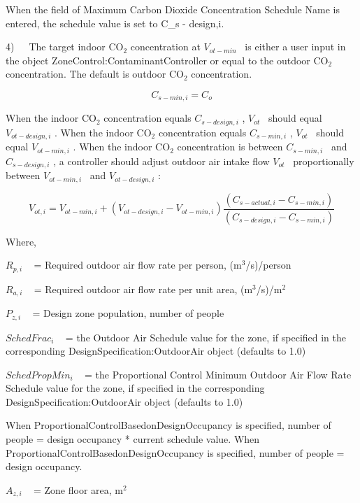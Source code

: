 When the field of Maximum Carbon Dioxide Concentration Schedule Name is entered, the schedule value is set to {C_{s - design,i}}. 

4)~~~The target indoor CO\(_{2}\) concentration at \({V_{ot - min}}\) ~is either a user input in the object ZoneControl:ContaminantController or equal to the outdoor CO\(_{2}\) concentration. The default is outdoor CO\(_{2}\) concentration.

\begin{equation}
{C_{s - min,i}} = {C_o}
\end{equation}

When the indoor CO\(_{2}\) concentration equals \({C_{s - design,i}}\) , \({V_{ot}}\) ~should equal \({V_{ot - design,i}}\) . When the indoor CO\(_{2}\) concentration equals \({C_{s - min,i}}\) , \({V_{ot}}\) ~should equal \({V_{ot - min,i}}\) . When the indoor CO\(_{2}\) concentration is between \({C_{s - min,i}}\) ~and \({C_{s - design,i}}\) , a controller should adjust outdoor air intake flow \({V_{ot}}\) ~proportionally between \({V_{ot - min,i}}\) ~and \({V_{ot - design,i}}\) :

\begin{equation}
{V_{ot,i}} = {V_{ot - min,i}} + ({V_{ot - design,i}} - {V_{ot - min,i}})\frac{{({C_{s - actual,i}} - {C_{s - min,i}})}}{{({C_{s - design,i}} - {C_{s - min,i}})}}
\end{equation}

Where,

\({R_{p,i}}\) ~ = Required outdoor air flow rate per person, (m\(^{3}\)/s)/person

\({R_{a,i}}\) ~ = Required outdoor air flow rate per unit area, (m\(^{3}\)/s)/m\(^{2}\)

\({P_{z,i}}\) ~ = Design zone population, number of people

\({SchedFrac_i}\) ~ = the Outdoor Air Schedule value for the zone, if specified in the corresponding DesignSpecification:OutdoorAir object (defaults to 1.0)

\({SchedPropMin_i}\) ~ = the Proportional Control Minimum Outdoor Air Flow Rate Schedule value for the zone, if specified in the corresponding DesignSpecification:OutdoorAir object (defaults to 1.0)

When ProportionalControlBasedonDesignOccupancy is specified, number of people = design occupancy * current schedule value. When ProportionalControlBasedonDesignOccupancy is specified, number of people = design occupancy.

\({A_{z,i}}\) ~ = Zone floor area, m\(^{2}\)

